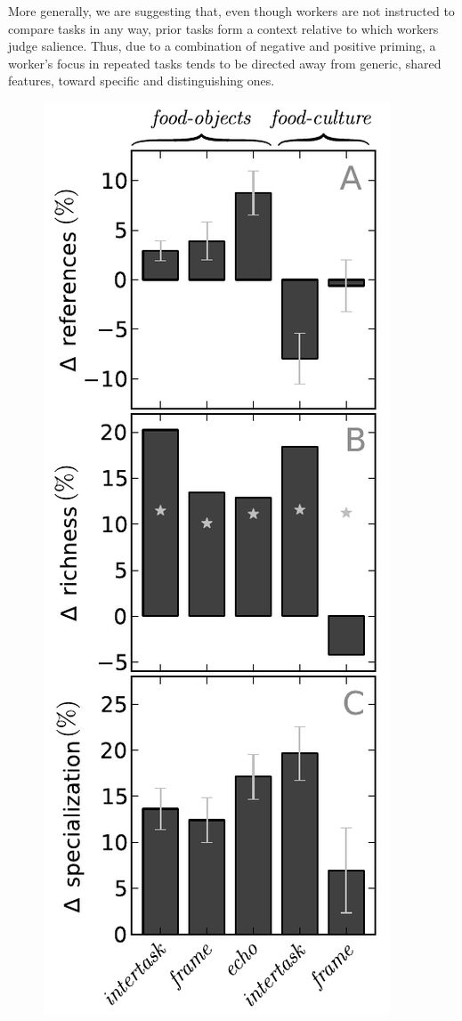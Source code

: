 \documentclass{pnastwo}
\begin{document}
\begin{article}
More generally, we are suggesting that, even though workers are not instructed
to compare tasks in any way, prior tasks form a context relative to which
workers judge salience.  Thus, due to a combination of negative and positive
priming, a worker's focus in repeated tasks tends to be directed away from
generic, shared features, toward specific and distinguishing ones.

\begin{figure}[h]
	\centering
	\includegraphics[scale=0.87]{figs/vocab_specificity.pdf}

\end{figure}
\end{article}
\end{document}
